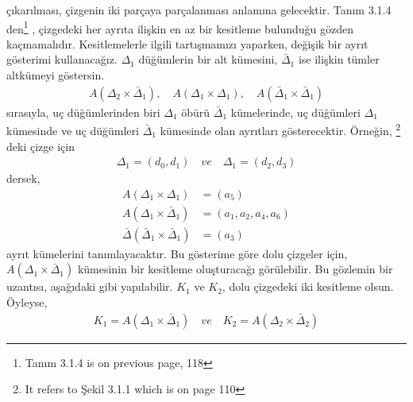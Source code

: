 \documentclass[11pt]{amsbook}
\begin{document}

çıkarılması, çizgenin iki parçaya parçalanması anlamına gelecektir. Tanım 3.1.4 den\footnote{Tanım 3.1.4 is on previous page, 118} , çizgedeki her ayrıta ilişkin en az bir kesitleme bulunduğu gözden kaçmamalıdır. Kesitlemelerle ilgili tartışmamızı yaparken, değişik bir ayrıt gösterimi kullanacağız. $\Delta_1$ düğümlerin bir alt kümesini, ${\bar \Delta}_1$ ise ilişkin tümler altkümeyi göstersin.
\begin{align*}
    	A(\Delta_2 \times {\bar\Delta}_1),  \quad
	A(\Delta_1 \times \Delta_1),  \quad
	A({\bar\Delta}_1 \times {\bar\Delta}_1)
\end{align*}
sırasıyla, uç düğümlerinden biri $\Delta_1$ öbürü $ {\bar\Delta}_1$ kümelerinde, uç düğümleri ${\Delta}_1$ kümesinde ve uç düğümleri $ {\bar\Delta}_1$ kümesinde olan ayrıtları gösterecektir. Örneğin,  \footnote{It refers to Şekil 3.1.1 which is on page 110} deki çizge için
\begin{align*}
    	\Delta_1 = (d_0,d_1)
	\quad ve \quad 
	\Delta_1 = (d_2,d_3)
\end{align*}
dersek,
\begin{align*}
    A(\Delta_1 \times \Delta_1) &= (a_5) \\
    A(\Delta_1 \times  {\bar\Delta}_1) &= (a_1, a_2, a_4, a_6) \\
     {\bar\Delta}( {\bar\Delta}_1 \times  {\bar\Delta}_1) &= (a_3)
\end{align*}
ayrıt kümelerini tanımlayacaktır. Bu gösterime göre dolu çizgeler için, $A(\Delta_1 \times  {\bar\Delta}_1)$ kümesinin bir kesitleme oluşturacağı görülebilir. Bu gözlemin bir uzantısı, aşağıdaki gibi yapılabilir. $K_1$ ve $K_2$, dolu çizgedeki iki kesitleme olsun. Öyleyse,
\begin{align*}
    	K_1 = A(\Delta_1 \times  {\bar\Delta}_1) 
	\quad ve \quad 
    	K_2 = A(\Delta_2 \times  {\bar\Delta}_2)
\end{align*}
\end{document}

